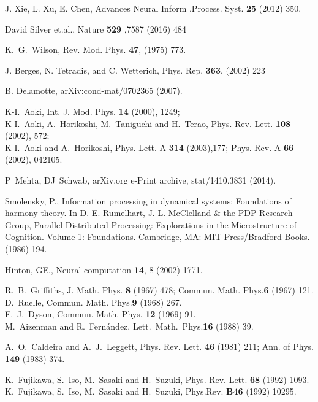 \documentclass[a4paper,preprint,superscriptaddress,preprintnumbers,nofootinbib]{revtex4}
\begin{document}
\begin{thebibliography}{30}

J. Xie, L. Xu, E. Chen, Advances Neural Inform .Process. Syst. {\bf 25} (2012) 350.

David Silver et.al., Nature {\bf 529} ,7587 (2016) 484

K.~G.~Wilson, Rev. Mod. Phys. {\bf 47}, (1975) 773.

J. Berges, N. Tetradis, and C. Wetterich, Phys. Rep. {\bf 363}, (2002) 223

B. Delamotte, arXiv:cond-mat/0702365 (2007).

K-I.~Aoki, Int. J. Mod. Phys. {\bf 14} (2000), 1249; \\
K-I.~Aoki, A.~Horikoshi, M.~Taniguchi and H.~Terao, Phys. Rev. Lett.
{\bf 108} (2002), 572;\\
K-I.~Aoki and A.~Horikoshi, Phys. Lett. A {\bf 314} (2003),177; Phys.
Rev. A {\bf 66} (2002), 042105.


 P~Mehta, DJ~Schwab, arXiv.org e-Print archive, stat/1410.3831 (2014).


 Smolensky, P., Information processing in dynamical
systems: Foundations of harmony theory. In D. E. Rumelhart, J. L.
McClelland \& the PDP Research Group, Parallel Distributed Processing:
Explorations in the Microstructure of Cognition. Volume 1: Foundations.
Cambridge, MA: MIT Press/Bradford Books. (1986) 194.

 Hinton, GE., Neural computation {\bf 14}, 8 (2002) 1771.

R.~B.~Griffiths, J. Math. Phys. {\bf 8} (1967) 478; Commun. Math. Phys.{\bf 6} (1967) 121.\\
D.~Ruelle, Commun. Math. Phys.{\bf 9} (1968) 267.\\
F.~J.~Dyson, Commun. Math. Phys. {\bf 12} (1969) 91.\\
M.~Aizenman and R.~Fern\'andez, Lett.~Math.~Phys.{\bf 16} (1988) 39.


A.~O.~Caldeira and A.~J.~Leggett, Phys. Rev. Lett. {\bf 46} (1981) 211;
Ann. of Phys. {\bf 149} (1983) 374.

K.~Fujikawa, S.~Iso, M.~Sasaki and H.~Suzuki,
Phys. Rev. Lett. {\bf 68} (1992) 1093.
K.~Fujikawa, S.~Iso, M.~Sasaki and H.~Suzuki,
Phys.Rev. {\bf B46} (1992) 10295.


\end{thebibliography}
\end{document}
